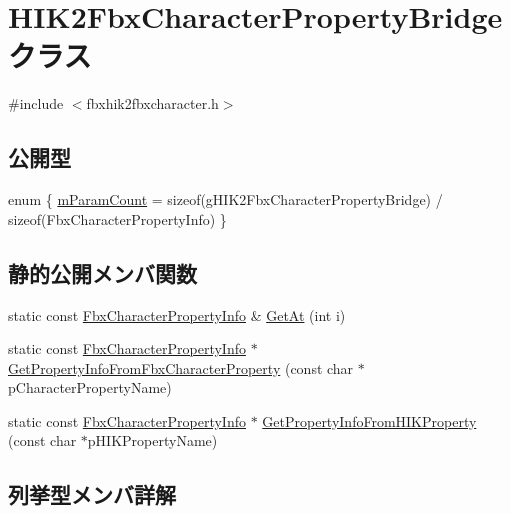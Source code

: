 \hypertarget{class_h_i_k2_fbx_character_property_bridge}{}\section{H\+I\+K2\+Fbx\+Character\+Property\+Bridge クラス}
\label{class_h_i_k2_fbx_character_property_bridge}


{\ttfamily \#include $<$fbxhik2fbxcharacter.\+h$>$}

\subsection*{公開型}
\begin{DoxyCompactItemize}
\item 
enum \{ \hyperlink{class_h_i_k2_fbx_character_property_bridge_ac10f28ca3e900cb0629889c0fd8bd87bac8e6c990d5975d6bf31634abcaff43f8}{m\+Param\+Count} = sizeof(g\+H\+I\+K2\+Fbx\+Character\+Property\+Bridge) / sizeof(Fbx\+Character\+Property\+Info)
 \}
\end{DoxyCompactItemize}
\subsection*{静的公開メンバ関数}
\begin{DoxyCompactItemize}
\item 
static const \hyperlink{class_fbx_character_property_info}{Fbx\+Character\+Property\+Info} \& \hyperlink{class_h_i_k2_fbx_character_property_bridge_ab3d905960717c287391f073b2e22c57f}{Get\+At} (int i)
\item 
static const \hyperlink{class_fbx_character_property_info}{Fbx\+Character\+Property\+Info} $\ast$ \hyperlink{class_h_i_k2_fbx_character_property_bridge_a43ed35a946a91d6face5b189b0f30754}{Get\+Property\+Info\+From\+Fbx\+Character\+Property} (const char $\ast$p\+Character\+Property\+Name)
\item 
static const \hyperlink{class_fbx_character_property_info}{Fbx\+Character\+Property\+Info} $\ast$ \hyperlink{class_h_i_k2_fbx_character_property_bridge_af240d0acf8c1577508d186132ef6011f}{Get\+Property\+Info\+From\+H\+I\+K\+Property} (const char $\ast$p\+H\+I\+K\+Property\+Name)
\end{DoxyCompactItemize}


\subsection{列挙型メンバ詳解}
\mbox{\label{class_h_i_k2_fbx_character_property_bridge_ac10f28ca3e900cb0629889c0fd8bd87b}} 
